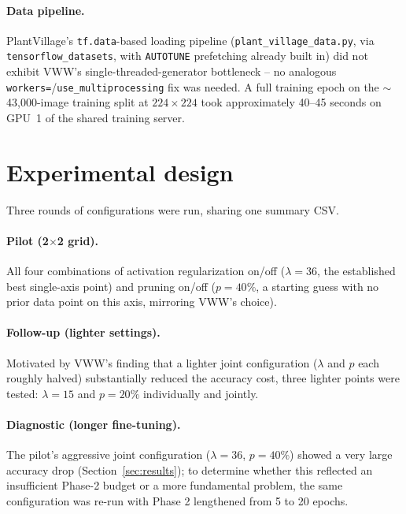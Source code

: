 \documentclass[11pt]{article}
\newcommand{\code}[1]{\texttt{#1}}
\begin{document}
\paragraph{Data pipeline.} PlantVillage's \code{tf.data}-based loading pipeline (\code{plant\_village\_data.py}, via \code{tensorflow\_datasets}, with \code{AUTOTUNE} prefetching already built in) did not exhibit VWW's single-threaded-generator bottleneck -- no analogous \code{workers=}/\code{use\_multiprocessing} fix was needed. A full training epoch on the $\sim$43,000-image training split at $224\times224$ took approximately 40--45 seconds on GPU~1 of the shared training server.

\section{Experimental design}

Three rounds of configurations were run, sharing one summary CSV.

\paragraph{Pilot (2$\times$2 grid).} All four combinations of activation regularization on/off ($\lambda=36$, the established best single-axis point) and pruning on/off ($p=40\%$, a starting guess with no prior data point on this axis, mirroring VWW's choice).

\paragraph{Follow-up (lighter settings).} Motivated by VWW's finding that a lighter joint configuration ($\lambda$ and $p$ each roughly halved) substantially reduced the accuracy cost, three lighter points were tested: $\lambda=15$ and $p=20\%$ individually and jointly.

\paragraph{Diagnostic (longer fine-tuning).} The pilot's aggressive joint configuration ($\lambda=36$, $p=40\%$) showed a very large accuracy drop (Section~\ref{sec:results}); to determine whether this reflected an insufficient Phase-2 budget or a more fundamental problem, the same configuration was re-run with Phase 2 lengthened from 5 to 20 epochs.
\end{document}
